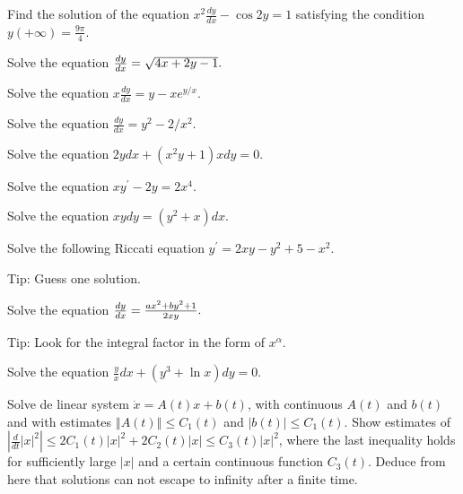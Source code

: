 \begin{task}
	Find the solution of the equation $x^{2}%
	\frac{dy}{dx}-\cos 2y=1$ satisfying the condition $y(+\infty )=\frac{9\pi }{4}$.
\end{task}

\begin{task}
	Solve the equation $\frac{dy}{dx}=\sqrt{%
		4x+2y-1}.$
\end{task}

\begin{task}
	Solve the equation $x\frac{dy}{dx}%
	=y-xe^{y/x}.$
\end{task}

\begin{task}
	Solve the equation $\frac{dy}{dx}%
	=y^{2}-2/x^{2}.$
\end{task}

\begin{task}
	Solve the equation $2ydx+(x^{2}y+1)xdy=0.$
\end{task}

\begin{task}
	Solve the equation $xy^{\prime
	}-2y=2x^{4}.$
\end{task}

\begin{task}
	Solve the equation $xydy=(y^{2}+x)dx.$
\end{task}

\begin{task}
	Solve the following Riccati equation $y^{\prime }=2xy-y^{2}+5-x^{2}.$
	
	Tip: Guess one solution.
\end{task}

\begin{task}
	Solve the equation $\frac{dy}{dx}=\frac{%
		ax^{2}+by^{2}+1}{2xy}.\ $
	
	Tip: Look for the integral factor in the form of $x^{\alpha}$.
\end{task}

\begin{task}
	Solve the equation $\frac{y}{x}%
	dx+(y^{3}+\ln x)dy=0.$
\end{task}

\begin{task}
	Solve de linear system $\dot{x}=A(t)x+b(t)$, with continuous $A(t)$ and $b(t)$ and with estimates $\left\Vert
	A(t)\right\Vert \leq C_{1}(t)$ and $\left\vert b(t)\right\vert \leq C_{1}(t)$. Show estimates of $\left\vert \frac{d}{dt}\left\vert x\right\vert
	^{2}\right\vert \leq 2C_{1}(t)\left\vert x\right\vert
	^{2}+2C_{2}(t)\left\vert x\right\vert \leq C_{3}(t)\left\vert x\right\vert
	^{2}$, where the last inequality holds for sufficiently large $\left\vert x\right\vert $ and a certain continuous function $C_{3}(t)$. Deduce from here that solutions can not escape to infinity after a finite time.
\end{task}

